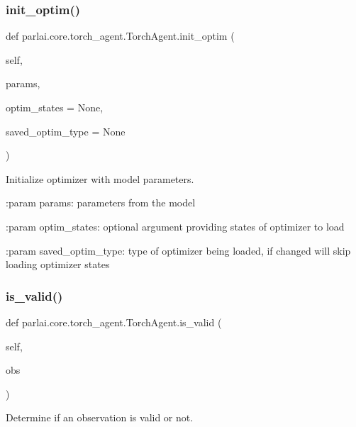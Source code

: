 \subsubsection{\texorpdfstring{init\+\_\+optim()}{init\_optim()}}
{\footnotesize\ttfamily def parlai.\+core.\+torch\+\_\+agent.\+Torch\+Agent.\+init\+\_\+optim (\begin{DoxyParamCaption}\item[{}]{self,  }\item[{}]{params,  }\item[{}]{optim\+\_\+states = {\ttfamily None},  }\item[{}]{saved\+\_\+optim\+\_\+type = {\ttfamily None} }\end{DoxyParamCaption})}

\begin{DoxyVerb}Initialize optimizer with model parameters.

:param params:
    parameters from the model

:param optim_states:
    optional argument providing states of optimizer to load

:param saved_optim_type:
    type of optimizer being loaded, if changed will skip loading
    optimizer states
\end{DoxyVerb}
 \mbox{\label{classparlai_1_1core_1_1torch__agent_1_1TorchAgent_afa491bf2384b017711ad722b5341b405}} 
\subsubsection{\texorpdfstring{is\+\_\+valid()}{is\_valid()}}
{\footnotesize\ttfamily def parlai.\+core.\+torch\+\_\+agent.\+Torch\+Agent.\+is\+\_\+valid (\begin{DoxyParamCaption}\item[{}]{self,  }\item[{}]{obs }\end{DoxyParamCaption})}

\begin{DoxyVerb}Determine if an observation is valid or not.
\end{DoxyVerb}
 \mbox{\label{classparlai_1_1core_1_1torch__agent_1_1TorchAgent_a32921aa09a682ee752d4822a5f5ebbb4}} 
